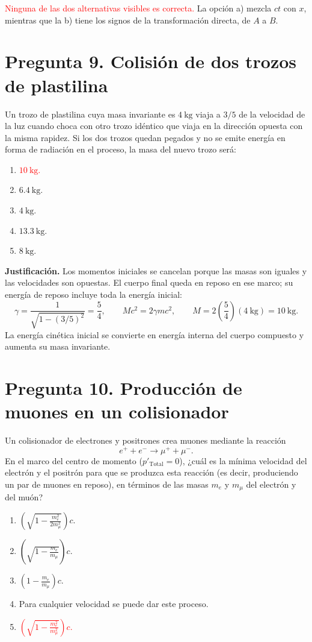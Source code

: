 \documentclass[a4paper,11pt]{article}
\newcommand{\pregunta}[2]{\section*{Pregunta #1. #2}}
\begin{document}
\textcolor{red}{Ninguna de las dos alternativas visibles es correcta.} La opción a) mezcla $ct$ con $x$, mientras que la b) tiene los signos de la transformación directa, de $A$ a $B$.

\pregunta{9}{Colisión de dos trozos de plastilina}

Un trozo de plastilina cuya masa invariante es $4\ \mathrm{kg}$ viaja a $3/5$ de la velocidad de la luz cuando choca con otro trozo idéntico que viaja en la dirección opuesta con la misma rapidez. Si los dos trozos quedan pegados y no se emite energía en forma de radiación en el proceso, la masa del nuevo trozo será:

\begin{enumerate}
    \item \textcolor{red}{$10\ \mathrm{kg}$.}
    \item $6.4\ \mathrm{kg}$.
    \item $4\ \mathrm{kg}$.
    \item $13.3\ \mathrm{kg}$.
    \item $8\ \mathrm{kg}$.
\end{enumerate}

\textbf{Justificación.} Los momentos iniciales se cancelan porque las masas son iguales y las velocidades son opuestas. El cuerpo final queda en reposo en ese marco; su energía de reposo incluye toda la energía inicial:
\[
\gamma=\frac{1}{\sqrt{1-(3/5)^2}}=\frac54,
\qquad Mc^2=2\gamma mc^2,
\qquad M=2\left(\frac54\right)(4\ \mathrm{kg})=10\ \mathrm{kg}.
\]
La energía cinética inicial se convierte en energía interna del cuerpo compuesto y aumenta su masa invariante.

\pregunta{10}{Producción de muones en un colisionador}

Un colisionador de electrones y positrones crea muones mediante la reacción
\[
e^+ + e^- \longrightarrow \mu^+ + \mu^-.
\]
En el marco del centro de momento ($p'_{\mathrm{Total}}=0$), ¿cuál es la mínima velocidad del electrón y el positrón para que se produzca esta reacción (es decir, produciendo un par de muones en reposo), en términos de las masas $m_e$ y $m_\mu$ del electrón y del muón?

\begin{enumerate}[itemsep=0.3em]
    \item $\displaystyle \left(\sqrt{1-\frac{m_e^2}{2m_\mu^2}}\right)c$.
    \item $\displaystyle \left(\sqrt{1-\frac{m_e}{m_\mu}}\right)c$.
    \item $\displaystyle \left(1-\frac{m_e}{m_\mu}\right)c$.
    \item Para cualquier velocidad se puede dar este proceso.
    \item \textcolor{red}{$\displaystyle \left(\sqrt{1-\frac{m_e^2}{m_\mu^2}}\right)c$.}
\end{enumerate}
\end{document}
